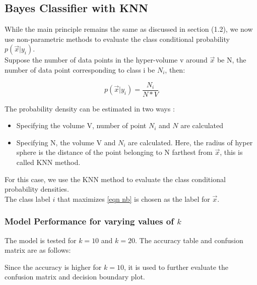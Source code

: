 \documentclass[11pt,a4paper]{article}
\newcommand{\noi}{\noindent}
\begin{document}
\subsection{Bayes Classifier with KNN}

While the main principle remains the same as discussed in section (1.2), we now use non-parametric methods to evaluate the class conditional probability $p(\vec{x}|y_{i})$.
\\Suppose the number of data points in the hyper-volume v around $\vec{x}$ be N, the number of data point corresponding to class i be $N_i$, then:

\begin{equation}
    p(\vec{x}|y_{i})=\frac{N_{i}}{N*V}
\end{equation}

The probability density can be estimated in two ways :
\begin{itemize}
    \itemsep0em
    \item Specifying the volume V, number of point $N_i$ and $N$ are calculated
    \item Specifying N, the volume V and $N_i$ are calculated. Here, the radius of hyper sphere is the distance of the point belonging to N farthest from $\vec{x}$, this is called KNN method.  
\end{itemize}

\noi
For this case, we use the KNN method to evaluate the class conditional probability densities.
\\ 
The class label $i$ that maximizes \autoref{eqn nb} is chosen as the label for $\vec{x}$. 

\subsubsection{Model Performance for varying values of $k$}
The model is tested for $k=10$ and $k=20$. The accuracy table and confusion matrix are as follows:


\noi
Since the accuracy is higher for $k=10$, it is used to further evaluate the confusion matrix and decision boundary plot. 
\end{document}
